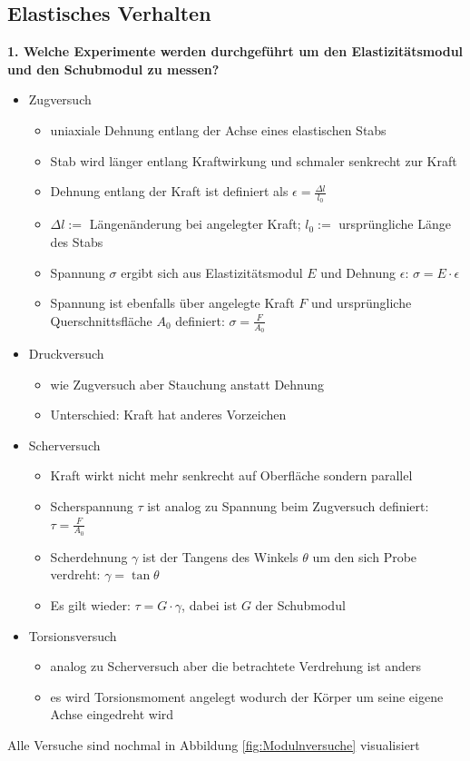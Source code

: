 \subsection{Elastisches Verhalten}
\noindent\textbf{1. Welche Experimente werden durchgeführt um den Elastizitätsmodul und den Schubmodul zu messen?}\\
\begin{addmargin}[25pt]{0pt}
\begin{itemize}
    \item Zugversuch
    \begin{itemize}
        \item uniaxiale Dehnung entlang der Achse eines elastischen Stabs
        \item Stab wird länger entlang Kraftwirkung und schmaler senkrecht zur Kraft
        \item Dehnung entlang der Kraft ist definiert als $\epsilon = \frac{\Delta l}{l_0}$
        \item $\Delta l :=$ Längenänderung bei angelegter Kraft; $l_0 :=$ ursprüngliche Länge des Stabs
        \item Spannung $\sigma$ ergibt sich aus Elastizitätsmodul $E$ und Dehnung $\epsilon$: $\sigma = E\cdot\epsilon$ 
        \item Spannung ist ebenfalls über angelegte Kraft $F$ und ursprüngliche Querschnittsfläche $A_0$ definiert: $\sigma = \frac{F}{A_0}$
    \end{itemize}
    \item Druckversuch
    \begin{itemize}
        \item wie Zugversuch aber Stauchung anstatt Dehnung 
        \item Unterschied: Kraft hat anderes Vorzeichen
    \end{itemize}
    \item Scherversuch
    \begin{itemize}
        \item Kraft wirkt nicht mehr senkrecht auf Oberfläche sondern parallel
        \item Scherspannung $\tau$ ist analog zu Spannung beim Zugversuch definiert: $\tau = \frac{F}{A_0}$
        \item Scherdehnung $\gamma$ ist der Tangens des Winkels $\theta$ um den sich Probe verdreht: $\gamma = \tan\theta$
        \item Es gilt wieder: $\tau = G\cdot\gamma$, dabei ist $G$ der Schubmodul
    \end{itemize}
    \item Torsionsversuch
    \begin{itemize}
        \item analog zu Scherversuch aber die betrachtete Verdrehung ist anders
        \item es wird Torsionsmoment angelegt wodurch der Körper um seine eigene Achse eingedreht wird
    \end{itemize}
\end{itemize}
Alle Versuche sind nochmal in Abbildung \ref{fig:Modulnversuche} visualisiert


\end{addmargin}
